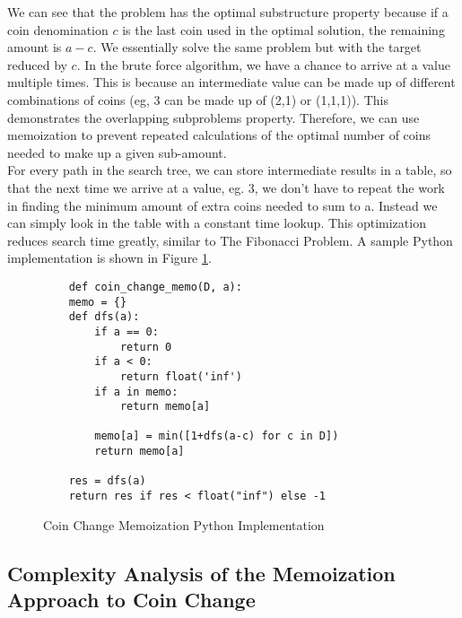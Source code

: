 We can see that the problem has the optimal substructure property because if a coin denomination $c$ is the last coin used in the optimal solution,
the remaining amount is $a-c$. We essentially solve the same problem but with the target reduced by $c$.
In the brute force algorithm, we have a chance to arrive at a value multiple times.
This is because an intermediate value can be made up of different combinations of coins (eg, 3 can be made up of (2,1) or (1,1,1)).
This demonstrates the overlapping subproblems property.
Therefore, we can use memoization to prevent repeated calculations of the optimal number of coins needed to make up a given sub-amount.\\
For every path in the search tree, we can store intermediate results in a table, so that the next time we arrive at a value, eg. 3, we don't have to repeat the work in finding the minimum amount of extra coins needed to sum to a.
Instead we can simply look in the table with a constant time lookup.
This optimization reduces search time greatly, similar to The Fibonacci Problem.
A sample Python implementation is shown in Figure \ref{fig:coin-change-memo}.

\begin{figure}[H]
    \centering
    \begin{lstlisting}
    def coin_change_memo(D, a):
    memo = {}
    def dfs(a):
        if a == 0:
            return 0
        if a < 0:
            return float('inf')
        if a in memo:
            return memo[a]
        
        memo[a] = min([1+dfs(a-c) for c in D])
        return memo[a]
            
    res = dfs(a)
    return res if res < float("inf") else -1
    \end{lstlisting}
    \caption{Coin Change Memoization Python Implementation}
    \label{fig:coin-change-memo}
\end{figure}

\subsection{Complexity Analysis of the Memoization Approach to Coin Change}\label{subsec:ca-coin-change-memo}


